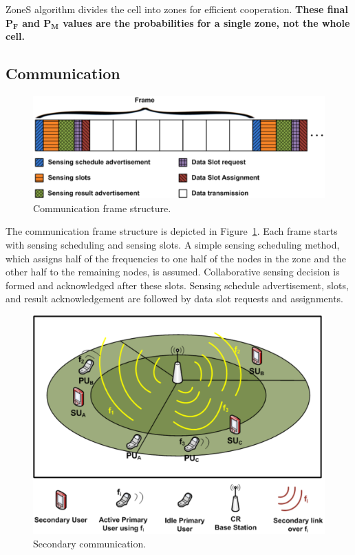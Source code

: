 \documentclass[conference,compsoc]{IEEEtran}
\newcommand{\probf}{\mathbf{P_F}}
\newcommand{\probm}{\mathbf{P_M}}
\begin{document}
ZoneS algorithm divides the cell into zones for efficient cooperation. \textbf{These final $\probf$ and $\probm$ values are the probabilities for a single zone, not the whole cell.}

\subsection{Communication}
\begin{figure}[!h]
\centering
\includegraphics[width=0.99\columnwidth,keepaspectratio] {figs/frameStructure.eps}
\caption{Communication frame structure.} \label{fig:frame_structure}
\end{figure}
The communication frame structure is depicted in Figure~\ref{fig:frame_structure}. Each frame starts with sensing scheduling and sensing slots. A simple sensing scheduling method, which assigns half of the frequencies to one half of the nodes in the zone and the other half to the remaining nodes, is assumed. Collaborative sensing decision is formed and acknowledged after these slots. Sensing schedule advertisement, slots, and result acknowledgement are followed by data slot requests and assignments.

\begin{figure}[!ht]
\centering
\includegraphics[width=0.99\columnwidth,keepaspectratio] {figs/communicationCases.eps}
\caption{Secondary communication.} \label{fig:network}
\end{figure}
\end{document}
